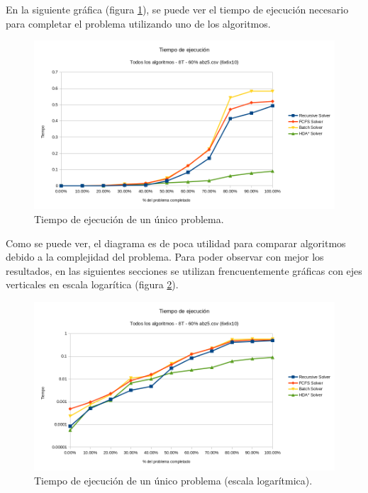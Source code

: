 \pagebreak

En la siguiente gráfica (figura \ref{fig:Runtime_One_Problem_Linear}),
se puede ver el tiempo de ejecución
necesario para completar el problema utilizando uno de los
algoritmos.

\begin{figure}[h]
    \centering
    \includegraphics[width=\textwidth]{Media/Ch2/Runtime_One_Problem_Linear.png}
    \caption{Tiempo de ejecución de un único problema.}
    \label{fig:Runtime_One_Problem_Linear}
\end{figure}

Como se puede ver, el diagrama es de poca utilidad
para comparar algoritmos
debido a la complejidad del problema.
Para poder observar con mejor los resultados,
en las siguientes secciones se utilizan frencuentemente
gráficas con ejes verticales en escala logarítica
(figura \ref{fig:Runtime_One_Problem_Log}).

\begin{figure}[h]
    \centering
    \includegraphics[width=\textwidth]{Media/Ch2/Runtime_One_Problem_Log.png}
    \caption{Tiempo de ejecución de un único problema (escala logarítmica).}
    \label{fig:Runtime_One_Problem_Log}
\end{figure}

